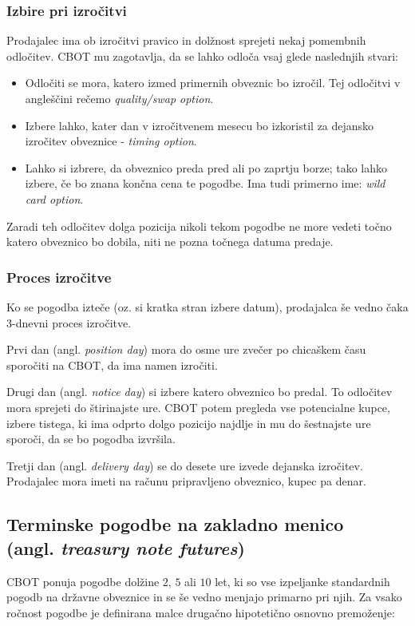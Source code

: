 \documentclass[a4paper]{article}
\begin{document}
\subsubsection{Izbire pri izročitvi}
Prodajalec ima ob izročitvi pravico in dolžnost sprejeti nekaj pomembnih odločitev. CBOT mu 
zagotavlja, da se lahko odloča vsaj glede naslednjih stvari:

\begin{itemize}
    \item Odločiti se mora, katero izmed primernih obveznic bo izročil. Tej odločitvi v angleščini 
            rečemo \textit{quality/swap option}.
    \item Izbere lahko, kater dan v izročitvenem mesecu bo izkoristil za dejansko izročitev
            obveznice - \textit{timing option}.
    \item Lahko si izbrere, da obveznico preda pred ali po zaprtju borze; tako lahko izbere, če 
            bo znana končna cena te pogodbe. Ima tudi primerno ime: \textit{wild card option}. 
\end{itemize}

Zaradi teh odločitev dolga pozicija nikoli tekom pogodbe ne more vedeti točno katero obveznico bo
dobila, niti ne pozna točnega datuma predaje.

\subsubsection{Proces izročitve}
Ko se pogodba izteče (oz. si kratka stran izbere datum), prodajalca še vedno čaka 3-dnevni proces 
izročitve. 

Prvi dan (angl. \textit{position day}) mora do osme ure zvečer po chicaškem času sporočiti na 
CBOT, da ima namen izročiti. 

Drugi dan (angl. \textit{notice day}) si izbere katero obveznico bo predal. To odločitev mora 
sprejeti do štirinajste ure. CBOT potem pregleda vse potencialne kupce, izbere tistega, ki 
ima odprto dolgo pozicijo najdlje in mu do šestnajste ure sporoči, da se bo pogodba izvršila. 

Tretji dan (angl. \textit{delivery day}) se do desete ure izvede dejanska izročitev. Prodajalec 
mora imeti na računu pripravljeno obveznico, kupec pa denar. 


\subsection{Terminske pogodbe na zakladno menico \\ (angl. \textit{treasury note futures})}
CBOT ponuja pogodbe dolžine $2$, $5$ ali $10$ let, ki so vse izpeljanke standardnih pogodb na 
državne obveznice in se še vedno menjajo primarno pri njih. Za vsako ročnost pogodbe je 
definirana malce drugačno hipotetično osnovno premoženje:
\end{document}
